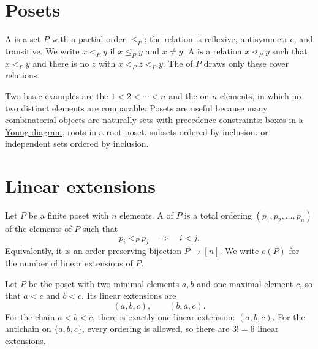 
\section[posets]{Posets}

A \label{poset} is a set $P$ with a partial order $\leq_P$:
the relation is reflexive, antisymmetric, and transitive.  We write
$x\lt_P y$ if $x\leq_P y$ and $x\neq y$.  A
\label{coverRelation} is a relation
$x\lessdot_P y$ such that $x\lt_P y$ and there is no $z$ with
$x\lt_P z\lt_P y$.  The
\label{hasseDiagram} of $P$ draws only these cover
relations.

Two basic examples are the \label{chainPoset}
$1\lt 2\lt \dotsb \lt n$ and the \label{antichain} on $n$
elements, in which no two distinct elements are comparable.  Posets are useful
because many combinatorial objects are naturally sets with precedence
constraints: boxes in a \hyperref[youngDiagram]{Young diagram}, roots in a
root poset, subsets ordered by inclusion, or independent sets ordered by
inclusion.

\section[linearExtensions]{Linear extensions}

Let $P$ be a finite poset with $n$ elements.  A
\label{linearExtension} of $P$ is a total ordering
$(p_1,p_2,\dotsc,p_n)$ of the elements of $P$ such that
\[
  p_i\lt_P p_j \quad\Longrightarrow\quad i\lt j.
\]
Equivalently, it is an order-preserving bijection $P\to [n]$.
We write $e(P)$ for the number of linear extensions of $P$.

\begin{example*}
Let $P$ be the poset with two minimal elements $a,b$ and one maximal element
$c$, so that $a\lt c$ and $b\lt c$.  Its linear extensions are
\[
  (a,b,c),\qquad (b,a,c).
\]
For the chain $a\lt b\lt c$, there is exactly one linear extension:
$(a,b,c)$.  For the antichain on $\{a,b,c\}$, every ordering is allowed, so
there are $3!=6$ linear extensions.
\end{example*}

